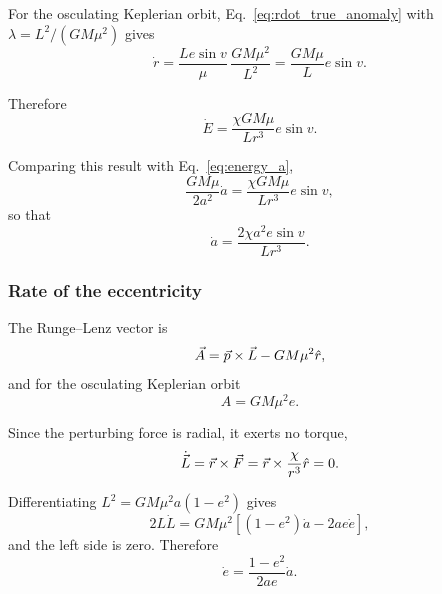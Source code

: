 	For the osculating Keplerian orbit, Eq.~\eqref{eq:rdot_true_anomaly} with $\lambda=L^2/(GM\mu^2)$ gives
	\begin{equation}
		\dot r
		=
		\frac{Le\sin v}{\mu}\,\frac{GM\mu^2}{L^2}
		=
		\frac{GM\mu}{L}e\sin v.
		\label{eq:osculating_rdot}
	\end{equation}
	
	Therefore
	\begin{equation}
		\dot E
		=
		\frac{\chi GM\mu}{Lr^3}e\sin v.
	\end{equation}
	
	Comparing this result with Eq.~\eqref{eq:energy_a},
	\begin{equation}
		\frac{GM\mu}{2a^2}\dot a
		=
		\frac{\chi GM\mu}{Lr^3}e\sin v,
	\end{equation}
	so that
	\begin{equation}
		\boxed{
			\dot a
			=
			\frac{2\chi a^2e\sin v}{Lr^3}
		}.
		\label{eq:adot}
	\end{equation}
	
	
	\subsubsection{Rate of the eccentricity}
	
	The Runge--Lenz vector is
	\begin{equation}
		\vec A
		=
		\vec p\times\vec L
		-
		GM\mu^2\hat r,
		\label{eq:A_definition}
	\end{equation}
	and for the osculating Keplerian orbit
	\begin{equation}
		A
		=
		GM\mu^2 e.
		\label{eq:A_e}
	\end{equation}
	
	Since the perturbing force is radial, it exerts no torque,
	\begin{equation}
		\dot{\vec L}
		=
		\vec r\times\vec F
		=
		\vec r\times
		\frac{\chi}{r^3}\hat r
		=
		0.
		\label{eq:Ldot_zero}
	\end{equation}
	
	Differentiating $L^2=GM\mu^2a(1-e^2)$ gives
	\begin{equation}
		2L\dot L
		=
		GM\mu^2
		\left[
		(1-e^2)\dot a
		-
		2ae\dot e
		\right],
	\end{equation}
	and the left side is zero. Therefore
	\begin{equation}
		\dot e
		=
		\frac{1-e^2}{2ae}\dot a .
		\label{eq:edot_adot}
	\end{equation}
	

